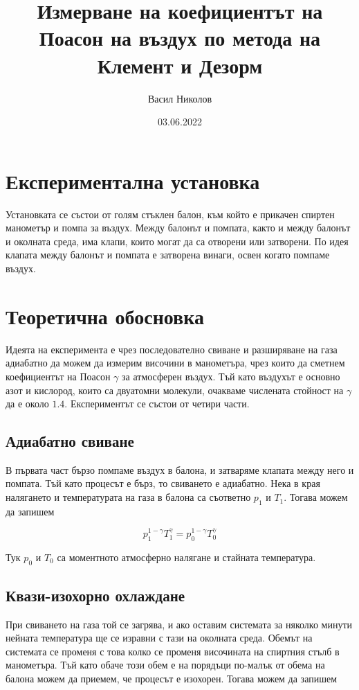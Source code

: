 \documentclass[%
 reprint,
 amsmath,amssymb,
 aps,
]{revtex4-2}
\begin{document}
\setlength{\abovedisplayskip}{3pt}
\setlength{\belowdisplayskip}{3pt}    

\title{Измерване на коефициентът на Поасон на въздух по метода на Клемент и Дезорм}
\author{Васил Николов}
\date{03.06.2022}
\maketitle
\section{Експериментална установка}

Установката се състои от голям стъклен балон, към който е прикачен спиртен манометър и помпа за въздух. Между балонът и помпата, както и между балонът и околната среда, има клапи, които могат да са отворени или затворени. По идея клапата между балонът и помпата е затворена винаги, освен когато помпаме въздух. 

\section{Теоретична обосновка}

Идеята на експеримента е чрез последователно свиване и разширяване на газа адиабатно да можем да измерим височини в манометъра, чрез които да сметнем коефициентът на Поасон $\gamma$ за атмосферен въздух. Тъй като въздухът е основно азот и кислород, които са двуатомни молекули, очакваме числената стойност на $\gamma$ да е около $1.4$. Експериментът се състои от четири части. 

\subsection{Адиабатно свиване}

В първата част бързо помпаме въздух в балона, и затваряме клапата между него и помпата. Тъй като процесът е бърз, то свиването е адиабатно. Нека в края налягането и температурата на газа в балона са съответно $p_1$ и $T_1$. Тогава можем да запишем

\begin{equation*}
    p_1^{1-\gamma} T_1^{\gamma} = p_0^{1 - \gamma} T_0^{\gamma}
\end{equation*}

Тук $p_0$ и $T_0$ са моментното атмосферно налягане и стайната температура.

\subsection{Квази-изохорно охлаждане}
При свиването на газа той се загрява, и ако оставим системата за няколко минути нейната температура ще се изравни с тази на околната среда. Обемът на системата се променя с това колко се променя височината на спиртния стълб в манометъра. Тъй като обаче този обем е на порядъци по-малък от обема на балона можем да приемем, че процесът е изохорен. Тогава можем да запишем
\end{document}
